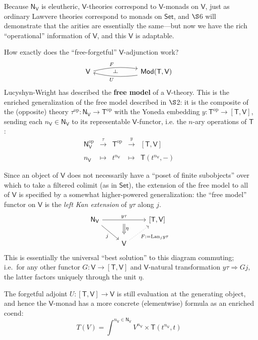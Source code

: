\documentclass{amsart}
\theoremstyle{definition}
\def\ld{\rotatebox[origin=c]{-90}{$\dashv$}} %
\newcommand{\Set}{\mathsf{Set}}
\newcommand{\Mod}{\mathsf{Mod}}
\newcommand{\NN}{\mathsf{N}}
\newcommand{\V}{\mathsf{V}}
\newcommand{\T}{\mathsf{T}}
\newcommand{\op}{\mathrm{op}}
\newcommand{\maps}{\colon}
\begin{document}
Because $\NN_\V$ is eleutheric, $\V$-theories correspond to $\V$-monads on $\V$, just as ordinary Lawvere theories correspond to monads on $\Set$, and $\S$6 will demonstrate that the arities are essentially the same---but now we have the rich ``operational'' information of $\V$, and this $\V$ is adaptable.

How exactly does the ``free-forgetful'' $\V$-adjunction work?
\[\begin{tikzcd}
\V \arrow[bend left=10,below]{rr}{F}
& \ld &
\arrow[bend left=10,above]{ll}{U} \Mod(\T,\V)
\end{tikzcd}\]
Lucyshyn-Wright \cite[Sec.\ 8]{rbb} has described the \textbf{free model} of a $\V$-theory.  This is the enriched generalization of the free model described in $\S$2: it is the composite of the (opposite) theory $\tau^\op\maps \NN_\V \to \T^\op$ with the Yoneda embedding $y\maps \T^\op \to [\T,\V]$, sending each $n_\V \in \NN_\V$ to its representable $\V$-functor, i.e. the $n$-ary operations of $\T$:
\[\begin{array}{rllll}
\NN_\V^\op & \xrightarrow{\tau} & \T^\op & \xrightarrow{y} & \left[\T,\V\right]\\
\\
n_\V & \mapsto & t^{n_\V} & \mapsto & \T(t^{n_\V},-)
\end{array}\]

Since an object of $\V$ does not necessarily have a ``poset of finite subobjects'' over which to take a filtered colimit (as in $\Set$), the extension of the free model to all of $\V$ is specified by a somewhat higher-powered generalization: the ``free model'' functor on $\V$ is the \textit{left Kan extension} of $y\tau$ along $j$.
\[\begin{tikzcd}
\NN_\V \arrow[rr,"y\tau"{name=y}] \arrow[swap,rd,"j"] & & \left[\T,\V\right]\\
& \V \arrow[swap,dotted, ru,"F:=\mathrm{Lan}_jy\tau"] \arrow[Rightarrow,from=y,"\eta", shorten >=0.2cm,shorten <=.2cm]
\end{tikzcd}\]
This is essentially the universal ``best solution'' to this diagram commuting; i.e.\ for any other functor $G \colon \V \to [\T,\V]$ and $\V$-natural transformation $y\tau \Rightarrow Gj$, the latter factors uniquely through the unit $\eta$.

The forgetful adjoint $U\maps [\T,\V] \to \V$ is still evaluation at the generating object, and hence the $\V$-monad has a more concrete (elementwise) formula as an enriched coend:
\begin{equation}
T(V) = \int^{n_\V\in \NN_\V} V^{n_\V} \times \T(t^{n_\V},t)
\end{equation}
\end{document}
